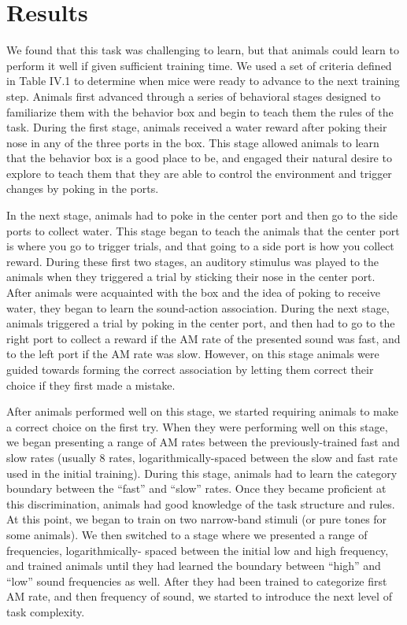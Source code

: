 \section{Results}

We found that this task was challenging to learn, but that animals could learn to perform it well if given sufficient training time.
%
We used a set of criteria defined in Table IV.1 to determine when mice were ready to advance to the next training step.
%
Animals first advanced through a series of behavioral stages designed to familiarize them with the behavior box and begin to teach them the rules of the task.
%
During the first stage, animals received a water reward after poking their nose
in any of the three ports in the box.
%
This stage allowed animals to learn that the behavior box is a good place to
be, and engaged their natural desire to explore to teach them that they are
able to control the environment and trigger changes by poking in the ports.

In the next stage, animals had to poke in the center port and then go to the
side ports to collect water.
%
This stage began to teach the animals that the center port is where you go to
trigger trials, and that going to a side port is how you collect reward.
%
During these first two stages, an auditory stimulus was played to the animals when they triggered a trial by sticking their nose in the center port.
%
After animals were acquainted with the box and the idea of poking to receive water, they began to learn the sound-action association.
%
During the next stage, animals triggered a trial by poking in the center port,
and then had to go to the right port to collect a reward if the AM rate of the
presented sound was fast, and to the left port if the AM rate was slow.
%
However, on this stage animals were guided towards forming the correct
association by letting them correct their choice if they first made a mistake.

After animals performed well on this stage, we started requiring animals to
make a correct choice on the first try.
%
When they were performing well on this stage, we began presenting a range of AM
rates between the previously-trained fast and slow rates (usually 8 rates,
logarithmically-spaced between the slow and fast rate used in the initial training).
%
During this stage, animals had to learn the category boundary between the
``fast'' and ``slow'' rates.
%
Once they became proficient at this discrimination, animals had good knowledge
of the task structure and rules.
%
At this point, we began to train on two narrow-band stimuli (or pure tones for
some animals).
%
We then switched to a stage where we presented a range of frequencies, logarithmically-
spaced between the initial low and high frequency, and
trained animals until they had learned the boundary between ``high'' and
``low'' sound frequencies as well.
%
After they had been trained to categorize first AM rate, and then frequency of sound,
we started to introduce the next level of task complexity.

